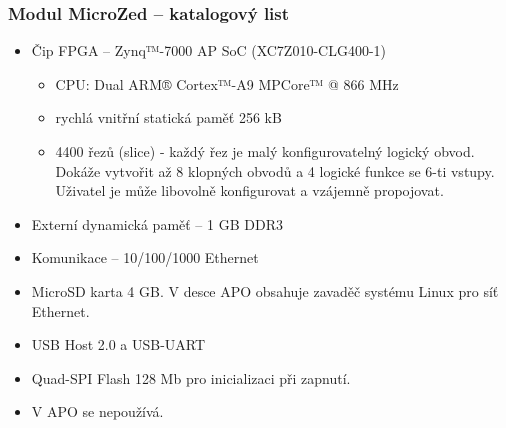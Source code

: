 \documentclass{beamer}
\begin{document}
\begin{frame}
\frametitle{Modul MicroZed -- katalogový list}

\begin{itemize}
 \item Čip FPGA – Zynq™-7000 AP SoC (XC7Z010-CLG400-1)
 \begin{itemize}
  \item CPU: Dual ARM® Cortex™-A9 MPCore™ @ 866 MHz
  \item rychlá vnitřní statická paměť 256 kB
  \item 4400 řezů (slice) - každý řez je malý konfigurovatelný logický obvod.
    Dokáže vytvořit až 8 klopných obvodů a 4 logické funkce se 6-ti vstupy.
    Uživatel je může libovolně konfigurovat a vzájemně propojovat.
 \end{itemize}
 \item Externí dynamická paměť – 1 GB DDR3
 \item Komunikace – 10/100/1000 Ethernet
 \item MicroSD karta 4 GB. V desce APO obsahuje zavaděč systému Linux pro síť Ethernet.
 \item USB Host 2.0 a USB-UART
 \item Quad-SPI Flash 128 Mb pro inicializaci při zapnutí.
 \item V APO se nepoužívá.
\end{itemize}
\end{frame}
\end{document}

